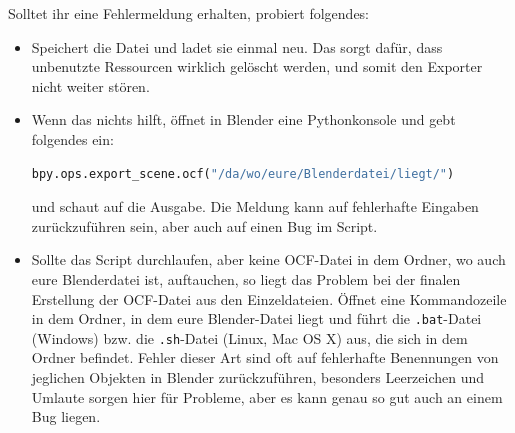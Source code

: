\documentclass[a4paper]{article}
\newcommand{\cfile}[1]{\texttt{#1}}
\begin{document}
Solltet ihr eine Fehlermeldung erhalten, probiert folgendes:
\begin{itemize}
\item Speichert die Datei und ladet sie einmal neu. Das sorgt dafür, dass unbenutzte Ressourcen wirklich gelöscht werden, und somit den Exporter nicht
  weiter stören.
\item Wenn das nichts hilft, öffnet in Blender eine Pythonkonsole und gebt folgendes ein:
  \begin{lstlisting}[language=python]
  bpy.ops.export_scene.ocf("/da/wo/eure/Blenderdatei/liegt/")
  \end{lstlisting}
  und schaut auf die Ausgabe. Die Meldung kann auf fehlerhafte Eingaben zurückzuführen sein, aber auch auf einen Bug im Script.
\item Sollte das Script durchlaufen, aber keine OCF-Datei in dem Ordner, wo auch eure Blenderdatei ist, auftauchen, so liegt das Problem bei der finalen
  Erstellung der OCF-Datei aus den Einzeldateien. Öffnet eine Kommandozeile in dem Ordner, in dem eure Blender-Datei liegt und führt die
  \cfile{.bat}-Datei (Windows) bzw. die \cfile{.sh}-Datei (Linux, Mac OS X) aus, die sich in dem Ordner befindet. Fehler dieser Art sind oft auf
  fehlerhafte Benennungen von jeglichen Objekten in Blender zurückzuführen, besonders Leerzeichen und Umlaute sorgen hier für Probleme, aber es kann
  genau so gut auch an einem Bug liegen.
\end{itemize}
\end{document}

